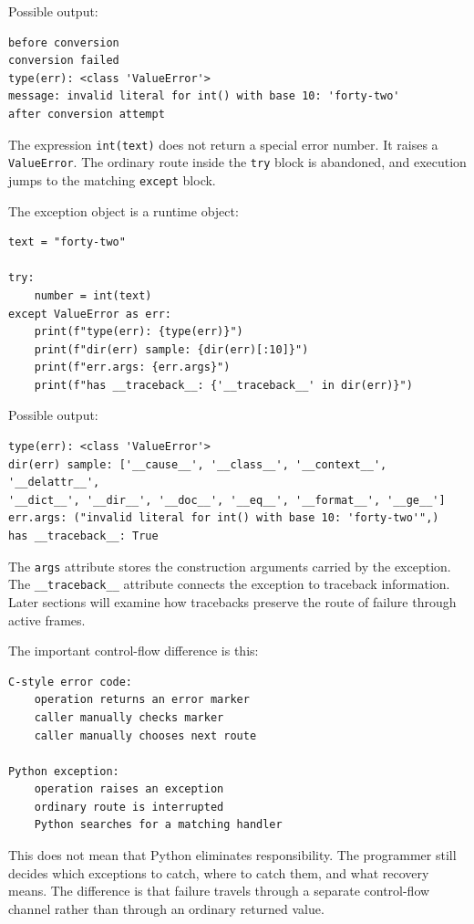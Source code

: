 \documentclass[a4paper,twoside]{report}
\begin{document}
Possible output:

\begin{verbatim}
before conversion
conversion failed
type(err): <class 'ValueError'>
message: invalid literal for int() with base 10: 'forty-two'
after conversion attempt
\end{verbatim}

The expression \texttt{int(text)} does not return a special error number. It raises a \texttt{ValueError}. The ordinary route inside the \texttt{try} block is abandoned, and execution jumps to the matching \texttt{except} block.

The exception object is a runtime object:

\begin{verbatim}
text = "forty-two"

try:
    number = int(text)
except ValueError as err:
    print(f"type(err): {type(err)}")
    print(f"dir(err) sample: {dir(err)[:10]}")
    print(f"err.args: {err.args}")
    print(f"has __traceback__: {'__traceback__' in dir(err)}")
\end{verbatim}

Possible output:

\begin{verbatim}
type(err): <class 'ValueError'>
dir(err) sample: ['__cause__', '__class__', '__context__', '__delattr__',
'__dict__', '__dir__', '__doc__', '__eq__', '__format__', '__ge__']
err.args: ("invalid literal for int() with base 10: 'forty-two'",)
has __traceback__: True
\end{verbatim}

The \texttt{args} attribute stores the construction arguments carried by the exception. The \texttt{\_\_traceback\_\_} attribute connects the exception to traceback information. Later sections will examine how tracebacks preserve the route of failure through active frames.

The important control-flow difference is this:

\begin{verbatim}
C-style error code:
    operation returns an error marker
    caller manually checks marker
    caller manually chooses next route

Python exception:
    operation raises an exception
    ordinary route is interrupted
    Python searches for a matching handler
\end{verbatim}

This does not mean that Python eliminates responsibility. The programmer still decides which exceptions to catch, where to catch them, and what recovery means. The difference is that failure travels through a separate control-flow channel rather than through an ordinary returned value.
\end{document}
